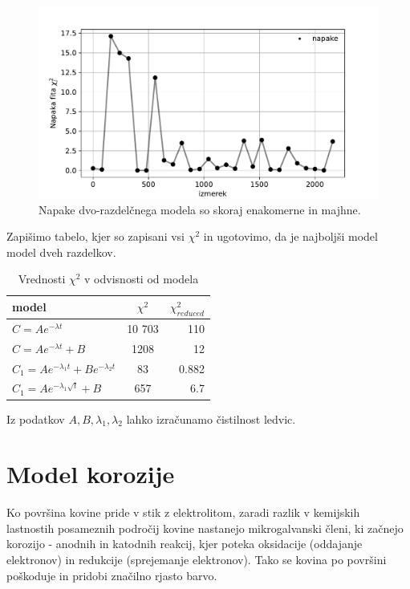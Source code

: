 \documentclass[11pt, a4paper]{article}
\begin{document}
 \begin{figure}[H]
   
  \includegraphics[width=16cm]{druga_napake_4.pdf}
 \caption{Napake dvo-razdelčnega modela so skoraj enakomerne in majhne.}
\end{figure}
Zapišimo tabelo, kjer so zapisani vsi $\chi^2$  in ugotovimo, da je najboljši model model dveh razdelkov.
\begin{table}[H]
  \begin{center}
    \caption{Vrednosti $\chi^2$ v odvisnosti od modela}
    \label{tab:table1}
    \begin{tabular}{l|c|r} %
      \textbf{model} & \textbf{$\chi^2$}  & \textbf{$\chi_{reduced}^2$} \\
      \hline
      $C = A e^{-\lambda t}$ & 10 703 & 110\\
      $C = A e^{-\lambda t} + B$ & 1208 & 12 \\
     $C_1 = A e^{-\lambda_1 t} + B e^{-\lambda_2 t}$ & 83 &  0.882\\
     $C_1 = A e^{-\lambda_1 \sqrt{t}} +B$  & 657 & 6.7 \\
    \end{tabular}
  \end{center}
\end{table}
Iz podatkov $A,B,\lambda_1,\lambda_2$ lahko izračunamo čistilnost ledvic.
\section{Model korozije}
Ko površina kovine pride v stik z elektrolitom, zaradi razlik v kemijskih lastnostih posameznih področij kovine nastanejo mikrogalvanski členi, ki začnejo korozijo - anodnih in katodnih reakcij, kjer poteka oksidacije (oddajanje elektronov) in redukcije (sprejemanje elektronov). Tako se kovina po površini poškoduje in pridobi značilno rjasto barvo.
\end{document}
